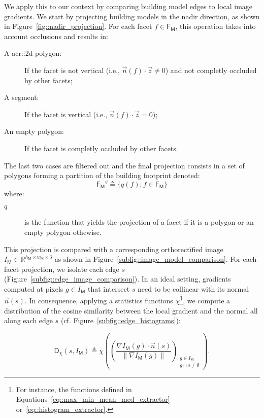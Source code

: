         We apply this to our context by comparing building model edges to local image gradients.
        We start by projecting building models in the nadir direction, as shown in Figure~\ref{fig::nadir_projection}.
        For each facet \(f \in \mathsf{F_M}\), this operation takes into account occlusions and results in:
        \begin{description}
            \item[A \gls{acr::2d} polygon:] If the facet is not vertical (i.e., \(\vec{n}(f) \cdot \vec{z} \neq 0\)) and not completly occluded by other facets;
            \item[A segment:] If the facet is vertical (i.e., \(\vec{n}(f) \cdot \vec{z} = 0\));
            \item[An empty polygon:] If the facet is completly occluded by other facets.
        \end{description}
        The last two cases are filtered out and the final projection consists in a set of polygons forming a partition of the building footprint denoted:
        \begin{equation}
            \label{eq::facet_projections}
            \mathsf{F_M}^q \triangleq \{q(f): f \in \mathsf{F_M}\}
        \end{equation}
        where:
        \begin{description}
            \item[\(q\)] is the function that yields the projection of a facet if it is a polygon or an empty polygon othewise.
        \end{description}

        This projection is compared with a corresponding orthorectified image \(I_{\mathsf{M}} \in \mathbb{R}^{h_{\mathsf{M}} \times w_{\mathsf{M}} \times 3}\) as shown in Figure~\ref{subfig::image_model_comparison}.
        For each facet projection, we isolate each edge \(s\) (Figure~\ref{subfig::edge_image_comparison}).
        In an ideal setting, gradients computed at pixels $g \in I_{\mathsf{M}}$ that intersect \(s\) need to be collinear with its normal $\vec{n}(s)$.
        In consequence, applying a statistics functions $\chi$\footnote{
            For instance, the functions defined in Equations~\ref{eq::max_min_mean_med_extractor} or~\ref{eq::histogram_extractor}.
        }, we compute a distribution of the cosine similarity between the local gradient and the normal all along each edge \(s\) (cf. Figure~\ref{subfig::edge_histograms}):
        
        \begin{equation}
            \label{eq::corr_seg}
            \mathsf{D}_{\chi}(s, I_{\mathsf{M}}) \triangleq \chi \left( \left(\frac{\nabla I_{\mathsf{M}}\left(g\right) \cdot \vec{n}(s)}{\left\rVert \nabla I_{\mathsf{M}}\left(g\right)\right\rVert}\right)_{\substack{g \in I_{\mathsf{M}} \\ g \cap s \neq \emptyset}} \right).
        \end{equation}

